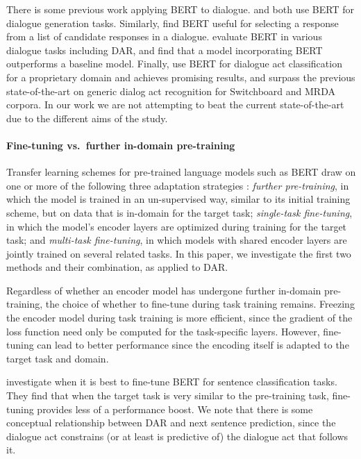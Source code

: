 \documentclass[11pt,a4paper]{article}
\begin{document}
There is some previous work applying BERT to dialogue.
\citet{baoPLATOPretrainedDialogue2019} and \citet{chenSemanticallyConditionedDialog2019a} both use BERT for dialogue generation tasks.
Similarly, \citet{vigComparisonTransferLearningApproaches2019} find BERT useful for selecting a response from a list of candidate responses in a dialogue.
\citet{mehriPretrainingMethodsDialog2019} evaluate BERT in various dialogue tasks including DAR, and find that a model incorporating BERT outperforms a baseline model.
Finally, \citet{chakravarty2019dialog} use BERT for dialogue act classification for a proprietary domain and achieves promising results, and \citet{ribeiro2019deep} surpass the previous state-of-the-art on generic dialog act recognition for Switchboard and MRDA corpora. In our work we are not attempting to beat the current state-of-the-art due to the different aims of the study.




\paragraph{Fine-tuning vs.~further in-domain pre-training}
Transfer learning schemes for pre-trained language models such as BERT draw on one or more of the following three adaptation strategies \citep{sunHowFineTuneBERT2019}:
\emph{further pre-training}, in which the model is trained in an un-supervised way, similar to its initial training scheme, but on data that is in-domain for the target task; 
\emph{single-task fine-tuning}, in which the model's encoder layers are optimized during training for the target task;
and \emph{multi-task fine-tuning}, in which models with shared encoder layers are jointly trained on several related tasks.
In this paper, we investigate the first two methods and their combination, as applied to DAR.

Regardless of whether an encoder model has undergone further in-domain pre-training, the choice of whether to fine-tune during task training remains.
Freezing the encoder model during task training is more efficient, since the gradient of the loss function need only be computed for the task-specific layers.
However, fine-tuning can lead to better performance since the encoding itself is adapted to the target task and domain.

\citet{petersTuneNotTune2019} investigate when it is best to fine-tune BERT for sentence classification tasks.
They find that when the target task is very similar to the pre-training task, fine-tuning provides less of a performance boost.
We note that there is some conceptual relationship between DAR and next sentence prediction, since the dialogue act constrains (or at least is predictive of) the dialogue act that follows it.
\end{document}
